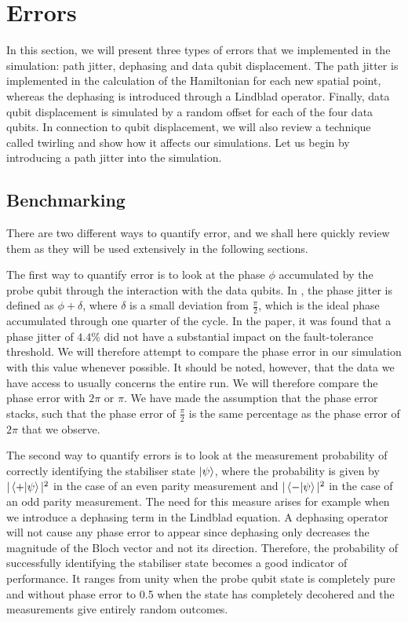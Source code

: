 

\section{Errors}
In this section, we will present three types of errors that we implemented in the simulation: path jitter, dephasing and data qubit displacement. The path jitter is implemented in the calculation of the Hamiltonian for each new spatial point, whereas the dephasing is introduced through a Lindblad operator. Finally, data qubit displacement is simulated by a random offset for each of the four data qubits. In connection to qubit displacement, we will also review a technique called twirling and show how it affects our simulations. Let us begin by introducing a path jitter into the simulation. 


\subsection{Benchmarking}
There are two different ways to quantify error, and we shall here quickly review them as they will be used extensively in the following sections. 

The first way to quantify error is to look at the phase $\phi$ accumulated by the probe qubit through the interaction with the data qubits. In \cite{the paper}, the phase jitter is defined as $\phi + \delta$, where $\delta$ is a small deviation from $\frac{\pi}{2}$, which is the ideal phase accumulated through one quarter of the cycle. In the paper, it was found that a phase jitter of $4.4 \%$ did not have a substantial impact on the fault-tolerance threshold. We will therefore attempt to compare the phase error in our simulation with this value whenever possible. It should be noted, however, that the data we have access to usually concerns the entire run. We will therefore compare the phase error with $2\pi$ or $\pi$. We have made the assumption that the phase error stacks, such that the phase error of $\frac{\pi}{2}$ is the same percentage as the phase error of $2\pi$ that we observe. 

The second way to quantify errors is to look at the measurement probability of correctly identifying the stabiliser state  $\ket{\psi}$, where the probability is given by $|\left\langle +|\psi \right\rangle|^2$ in the case of an even parity measurement and $|\left\langle - |\psi \right\rangle|^2$ in the case of an odd parity measurement. The need for this measure arises for example when we introduce a dephasing term in the Lindblad equation. A dephasing operator will not cause any phase error to appear since dephasing only decreases the magnitude of the Bloch vector and not its direction. Therefore, the probability of successfully identifying the stabiliser state becomes a good indicator of performance. It ranges from unity when the probe qubit state is completely pure and without phase error to 0.5 when the state has completely decohered and the measurements give entirely random outcomes. 


